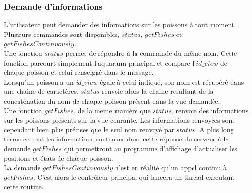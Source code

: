 \subsubsection{Demande d'informations}
L'utilisateur peut demander des informations sur les poissons à tout moment. Plusieurs commandes sont disponibles, $status$, $getFishes$ et $getFishesContinuously$.\\
Une fonction $status$ permet de répondre à la commande du même nom. Cette fonction parcourt simplement l'aquarium principal et compare l'$id\_view$ de chaque poisson et celui renseigné dans le message.\\
 Lorsqu'un poisson a un $id\_view$ égale à celui indiqué, son nom est récupéré dans une chaine de caractères. $status$ renvoie alors la chaine resultant de la concaténation du nom de chaque poisson présent dans la vue demandée.\\
Une fonction $getFishes$, de la meme manière que $status$, renvoie des informations sur les poissons présents sur la vue courante.
Les informations renvoyées sont cependant bien plus précises que le seul nom renvoyé par $status$. A plus long terme ce sont les informations contenues dans cette réponse du serveur à la demande $getFishes$ qui permettront au programme d'affichage d'actualiser les positions et états de chaque poisson.\\
La demande $getFishesContinuously$ n'est en réalité qu'un appel continu à $getFishes$. C'est alors le contrôleur principal qui lancera un thread executant cette routine.
